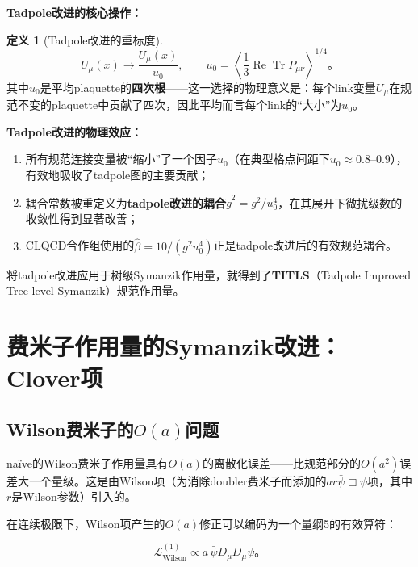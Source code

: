 \documentclass[12pt,a4paper]{ctexart}
\theoremstyle{definition}
\newtheorem{definition}{定义}[section]
\begin{document}
\textbf{Tadpole改进的核心操作：}

\begin{definition}[Tadpole改进的重标度]
\begin{equation}
\boxed{U_\mu(x) \to \frac{U_\mu(x)}{u_0}}, \qquad u_0 = \left\langle \frac{1}{3}\operatorname{Re}\operatorname{Tr} P_{\mu\nu} \right\rangle^{1/4}。
\label{eq:tadpole_rescaling}
\end{equation}
其中$u_0$是平均plaquette的\textbf{四次根}——这一选择的物理意义是：每个link变量$U_\mu$在规范不变的plaquette中贡献了四次，因此平均而言每个link的``大小''为$u_0$。
\end{definition}

\textbf{Tadpole改进的物理效应：}

\begin{enumerate}
    \item 所有规范连接变量被``缩小''了一个因子$u_0$（在典型格点间距下$u_0 \approx 0.8\text{--}0.9$），有效地吸收了tadpole图的主要贡献；
    \item 耦合常数被重定义为\textbf{tadpole改进的耦合}$\tilde{g}^2 = g^2/u_0^4$，在其展开下微扰级数的收敛性得到显著改善；
    \item CLQCD合作组使用的$\hat{\beta} = 10/(g^2 u_0^4)$正是tadpole改进后的有效规范耦合\cite{CLQCD2025quark_mass,CLQCD2024charm}。
\end{enumerate}

将tadpole改进应用于树级Symanzik作用量，就得到了\textbf{TITLS}（Tadpole Improved Tree-level Symanzik）规范作用量。

\section{费米子作用量的Symanzik改进：Clover项}

\subsection{Wilson费米子的$O(a)$问题}

na\"ive的Wilson费米子作用量具有$O(a)$的离散化误差——比规范部分的$O(a^2)$误差大一个量级。这是由Wilson项（为消除doubler费米子而添加的$ar\bar{\psi}\Box\psi$项，其中$r$是Wilson参数）引入的。

在连续极限下，Wilson项产生的$O(a)$修正可以编码为一个量纲5的有效算符：

\begin{equation}
\mathcal{L}^{(1)}_{\text{Wilson}} \propto a \, \bar{\psi} D_\mu D_\mu \psi。
\end{equation}
\end{document}
